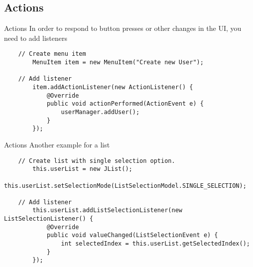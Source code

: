 \subsection{Actions}
\begin{frame}[fragile]{Actions}
  In order to respond to button presses or other changes in the UI, you need to add listeners
	\begin{lstlisting}
    // Create menu item
		MenuItem item = new MenuItem("Create new User");
  
    // Add listener
		item.addActionListener(new ActionListener() {
			@Override
			public void actionPerformed(ActionEvent e) {
				userManager.addUser();
			}
		});
	\end{lstlisting}
\end{frame}

\begin{frame}[fragile]{Actions}
  Another example for a list
	\begin{lstlisting}
    // Create list with single selection option.
		this.userList = new JList();
		this.userList.setSelectionMode(ListSelectionModel.SINGLE_SELECTION);
      
    // Add listener
		this.userList.addListSelectionListener(new ListSelectionListener() {
			@Override
			public void valueChanged(ListSelectionEvent e) {
				int selectedIndex = this.userList.getSelectedIndex();
			}
		});
	\end{lstlisting}
\end{frame}

